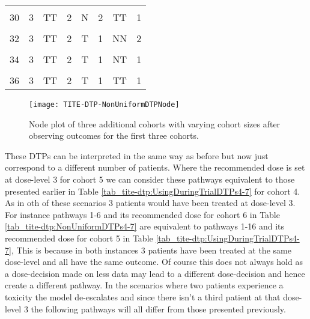 \begin{table}[H]
{\begin{tabular}[t]{cccccccc}
			\cellcolor{gray!6}{29} & \cellcolor{gray!6}{3} & \cellcolor{gray!6}{TT} & \cellcolor{gray!6}{2} & \cellcolor{gray!6}{N} & \cellcolor{gray!6}{2} & \cellcolor{gray!6}{TT} & \cellcolor{gray!6}{1}\\
			30 & 3 & TT & 2 & N & 2 & TT & 1\\
			\cellcolor{gray!6}{31} & \cellcolor{gray!6}{3} & \cellcolor{gray!6}{TT} & \cellcolor{gray!6}{2} & \cellcolor{gray!6}{T} & \cellcolor{gray!6}{1} & \cellcolor{gray!6}{NN} & \cellcolor{gray!6}{2}\\
			32 & 3 & TT & 2 & T & 1 & NN & 2\\
			\cellcolor{gray!6}{33} & \cellcolor{gray!6}{3} & \cellcolor{gray!6}{TT} & \cellcolor{gray!6}{2} & \cellcolor{gray!6}{T} & \cellcolor{gray!6}{1} & \cellcolor{gray!6}{NT} & \cellcolor{gray!6}{1}\\
			34 & 3 & TT & 2 & T & 1 & NT & 1\\
			\cellcolor{gray!6}{35} & \cellcolor{gray!6}{3} & \cellcolor{gray!6}{TT} & \cellcolor{gray!6}{2} & \cellcolor{gray!6}{T} & \cellcolor{gray!6}{1} & \cellcolor{gray!6}{TT} & \cellcolor{gray!6}{1}\\
			36 & 3 & TT & 2 & T & 1 & TT & 1\\
			\bottomrule
	\end{tabular}}
\end{table}

\begin{figure}[h!]
	\centering
	\caption[DTP node plot for three additional various sized cohorts.]{Node plot of three additional cohorts with varying cohort sizes after observing outcomes for the first three cohorts.}
	\label{fig_tite-dtp:NonUniformDTPNode4-7}
	\texttt{[image: TITE-DTP-NonUniformDTPNode]}
\end{figure}

These DTPs can be interpreted in the same way as before but now just correspond to a different number of patients. Where the recommended dose is set at dose-level 3 for cohort 5 we can consider these pathways equivalent to those presented earlier in Table \ref{tab_tite-dtp:UsingDuringTrialDTPs4-7} for cohort 4. As in oth of these scenarios 3 patients would have been treated at dose-level 3. For instance pathways 1-6 and its recommended dose for cohort 6 in Table \ref{tab_tite-dtp:NonUniformDTPs4-7} are equivalent to pathways 1-16 and its recommended dose for cohort 5 in Table \ref{tab_tite-dtp:UsingDuringTrialDTPs4-7}, This is because in both instances 3 patients have been treated at the same dose-level and all have the same outcome. Of course this does not always hold as a dose-decision made on less data may lead to a different dose-decision and hence create a different pathway. In the scenarios where two patients experience a toxicity the model de-escalates and since there isn't a third patient at that dose-level 3 the following pathways will all differ from those presented previously. 

